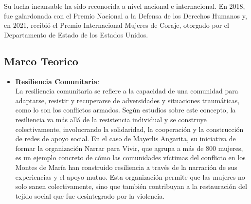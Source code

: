 \documentclass[letterpaper, 12pt]{article}
\begin{document}
Su lucha incansable ha sido reconocida a nivel nacional e internacional. En
2018, fue galardonada con el Premio Nacional a la Defensa de los Derechos
Humanos y, en 2021, recibió el Premio Internacional Mujeres de Coraje, otorgado
por el Departamento de Estado de los Estados Unidos.

\subsection*{Marco Teorico}

\begin{itemize}[label=$\bullet$]
      \item \textbf{Resiliencia Comunitaria}: \\ La resiliencia comunitaria se refiere a la
            capacidad de una comunidad para adaptarse, resistir y recuperarse de
            adversidades y situaciones traumáticas, como lo son los conflictos armados.
            Según estudios sobre este concepto, la resiliencia va más allá de la
            resistencia individual y se construye colectivamente, involucrando la
            solidaridad, la cooperación y la construcción de redes de apoyo social. En el
            caso de Mayerlis Angarita, su iniciativa de formar la organización Narrar para
            Vivir, que agrupa a más de 800 mujeres, es un ejemplo concreto de cómo las
            comunidades víctimas del conflicto en los Montes de María han construido
            resiliencia a través de la narración de sus experiencias y el apoyo mutuo. Esta
            organización permite que las mujeres no solo sanen colectivamente, sino que
            también contribuyan a la restauración del tejido social que fue desintegrado
            por la violencia.


\end{itemize}
\end{document}
